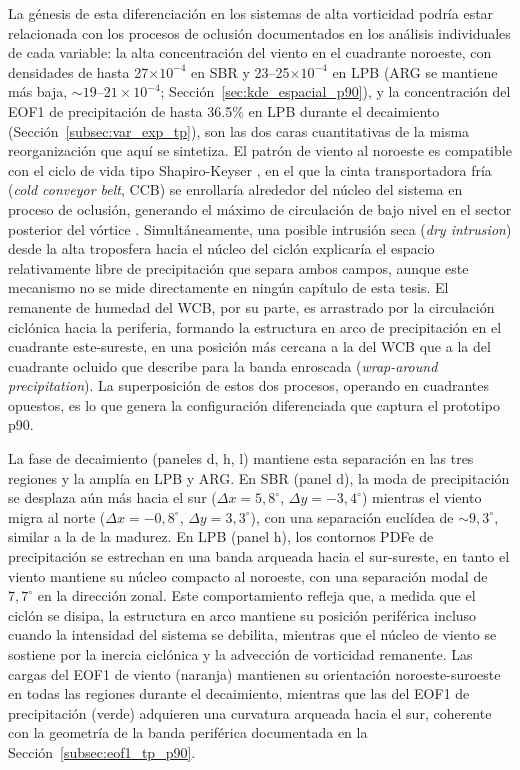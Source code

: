 La génesis de esta diferenciación en los sistemas de alta vorticidad podría estar relacionada con los procesos de oclusión documentados en los análisis individuales de cada variable: la alta concentración del viento en el cuadrante noroeste, con densidades de hasta 27$\times10^{-4}$ en SBR y 23--25$\times10^{-4}$ en LPB (ARG se mantiene más baja, ${\sim}19$--$21\times10^{-4}$; Sección~\ref{sec:kde_espacial_p90}), y la concentración del EOF1 de precipitación de hasta 36.5\% en LPB durante el decaimiento (Sección~\ref{subsec:var_exp_tp}), son las dos caras cuantitativas de la misma reorganización que aquí se sintetiza. El patrón de viento al noroeste es compatible con el ciclo de vida tipo Shapiro-Keyser \citep{shapiro1990life}, en el que la cinta transportadora fría (\textit{cold conveyor belt}, CCB) se enrollaría alrededor del núcleo del sistema en proceso de oclusión, generando el máximo de circulación de bajo nivel en el sector posterior del vórtice \citep{schemm2014linkage}. Simultáneamente, una posible intrusión seca (\textit{dry intrusion}) desde la alta troposfera hacia el núcleo del ciclón explicaría el espacio relativamente libre de precipitación que separa ambos campos, aunque este mecanismo no se mide directamente en ningún capítulo de esta tesis. El remanente de humedad del WCB, por su parte, es arrastrado por la circulación ciclónica hacia la periferia, formando la estructura en arco de precipitación en el cuadrante este-sureste, en una posición más cercana a la del WCB que a la del cuadrante ocluido que \citet{martin1999forcing} describe para la banda enroscada (\textit{wrap-around precipitation}). La superposición de estos dos procesos, operando en cuadrantes opuestos, es lo que genera la configuración diferenciada que captura el prototipo p90.

La fase de decaimiento (paneles d, h, l) mantiene esta separación en las tres regiones y la amplía en LPB y ARG. En SBR (panel d), la moda de precipitación se desplaza aún más hacia el sur ($\Delta x = 5{,}8^{\circ}$, $\Delta y = -3{,}4^{\circ}$) mientras el viento migra al norte ($\Delta x = -0{,}8^{\circ}$, $\Delta y = 3{,}3^{\circ}$), con una separación euclídea de ${\sim}9{,}3^{\circ}$, similar a la de la madurez. En LPB (panel h), los contornos PDFe de precipitación se estrechan en una banda arqueada hacia el sur-sureste, en tanto el viento mantiene su núcleo compacto al noroeste, con una separación modal de $7{,}7^{\circ}$ en la dirección zonal. Este comportamiento refleja que, a medida que el ciclón se disipa, la estructura en arco mantiene su posición periférica incluso cuando la intensidad del sistema se debilita, mientras que el núcleo de viento se sostiene por la inercia ciclónica y la advección de vorticidad remanente. Las cargas del EOF1 de viento (naranja) mantienen su orientación noroeste-suroeste en todas las regiones durante el decaimiento, mientras que las del EOF1 de precipitación (verde) adquieren una curvatura arqueada hacia el sur, coherente con la geometría de la banda periférica documentada en la Sección~\ref{subsec:eof1_tp_p90}.

